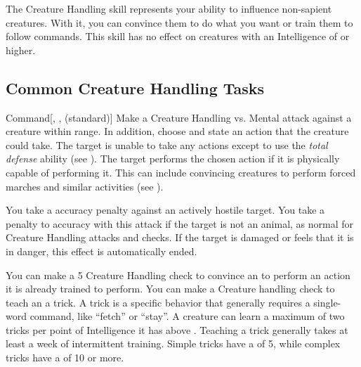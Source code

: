 \newpage
{}
    The Creature Handling skill represents your ability to influence non-sapient creatures.
    With it, you can convince them to do what you want or train them to follow commands.
    This skill has no effect on creatures with an Intelligence of  or higher.

    \subsection{Common Creature Handling Tasks}

        \begin{freeability}{Command}[, ,  (standard)]
            \label{Command}
            Make a Creature Handling vs. Mental attack against a creature within \rngmed range.
            In addition, choose and state an action that the creature could take.
            \hit The target is unable to take any actions except to use the \textit{total defense} ability (see ).
            \crit The target performs the chosen action if it is physically capable of performing it.
            This can include convincing creatures to perform forced marches and similar activities (see ).
            
            You take a  accuracy penalty against an actively hostile target.
            You take a  penalty to accuracy with this attack if the target is not an animal, as normal for Creature Handling attacks and checks.
            If the target is damaged or feels that it is in danger, this effect is automatically ended.
        \end{freeability}
         You can make a  5 Creature Handling check to convince an  to perform an action it is already trained to perform.
         You can make a Creature handling check to teach an  a trick.
        A trick is a specific behavior that generally requires a single-word command, like ``fetch'' or ``stay''.
        A creature can learn a maximum of two tricks per point of Intelligence it has above .
        Teaching a trick generally takes at least a week of intermittent training.
        Simple tricks have a  of 5, while complex tricks have a  of 10 or more.

